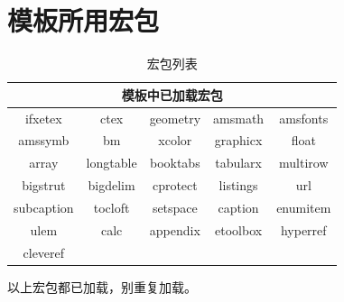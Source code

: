 \section{模板所用宏包}

\begin{table}[htbp]
  \centering
  \caption{宏包列表}
  \begin{tabular}{ccccc}
      \toprule
      \multicolumn{5}{c}{模板中已加载宏包} \\
      \midrule
      ifxetex & ctex & geometry & amsmath & amsfonts \\
      amssymb & bm & xcolor & graphicx & float \\
      array & longtable & booktabs & tabularx & multirow \\
      bigstrut & bigdelim & cprotect & listings & url \\
      subcaption & tocloft & setspace & caption & enumitem \\
      ulem & calc & appendix & etoolbox & hyperref \\
      cleveref & & & & \\
      \bottomrule
  \end{tabular}%
  \label{tab:addlabel}%
\end{table}

以上宏包都已加载，别重复加载。
